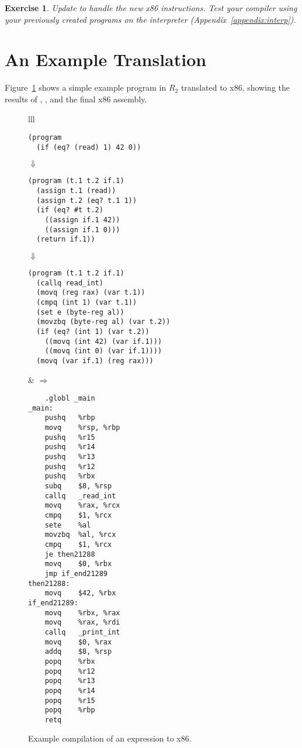 \documentclass[11pt]{book}
\newtheorem{exercise}[theorem]{Exercise}
\begin{document}
\begin{exercise}\normalfont
Update  to handle the new x86 instructions.
Test your compiler using your previously created programs on the
 interpreter (Appendix~\ref{appendix:interp}).
\end{exercise}


\section{An Example Translation}


Figure~\ref{fig:if-example-x86} shows a simple example program in
$R_2$ translated to x86, showing the results of ,
, and the final x86 assembly.

\begin{figure}[tbp]
\begin{tabular}{lll}
\begin{minipage}{0.5\textwidth}
\begin{lstlisting}
(program
  (if (eq? (read) 1) 42 0))
\end{lstlisting}
$\Downarrow$
\begin{lstlisting}
(program (t.1 t.2 if.1)
  (assign t.1 (read))
  (assign t.2 (eq? t.1 1))
  (if (eq? #t t.2)
    ((assign if.1 42))
    ((assign if.1 0)))
  (return if.1))
\end{lstlisting}
$\Downarrow$
\begin{lstlisting}
(program (t.1 t.2 if.1)
  (callq read_int)
  (movq (reg rax) (var t.1))
  (cmpq (int 1) (var t.1))
  (set e (byte-reg al))
  (movzbq (byte-reg al) (var t.2))
  (if (eq? (int 1) (var t.2))
    ((movq (int 42) (var if.1)))
    ((movq (int 0) (var if.1))))
  (movq (var if.1) (reg rax)))
\end{lstlisting}
\end{minipage}
&
$\Rightarrow$
\begin{minipage}{0.4\textwidth}
\begin{lstlisting}
	.globl _main
_main:
	pushq	%rbp
	movq	%rsp, %rbp
	pushq	%r15
	pushq	%r14
	pushq	%r13
	pushq	%r12
	pushq	%rbx
	subq	$8, %rsp
	callq	_read_int
	movq	%rax, %rcx
	cmpq	$1, %rcx
	sete	%al
	movzbq	%al, %rcx
	cmpq	$1, %rcx
	je then21288
	movq	$0, %rbx
	jmp if_end21289
then21288:
	movq	$42, %rbx
if_end21289:
	movq	%rbx, %rax
	movq	%rax, %rdi
	callq	_print_int
	movq	$0, %rax
	addq	$8, %rsp
	popq	%rbx
	popq	%r12
	popq	%r13
	popq	%r14
	popq	%r15
	popq	%rbp
	retq
\end{lstlisting}
\end{minipage}
\end{tabular}
\caption{Example compilation of an  expression to x86.}
\label{fig:if-example-x86}
\end{figure}
\end{document}
